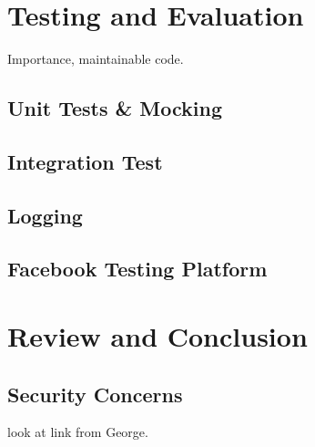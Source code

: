 \documentclass[a4paper, 11pt]{article}
\begin{document}
\clearpage


\section{Testing and Evaluation}
Importance, maintainable code.
\subsection{Unit Tests \& Mocking}
\subsection{Integration Test}
\subsection{Logging}
\subsection{Facebook Testing Platform}

\section{Review and Conclusion}
\subsection{Security Concerns} look at link from George. 




\vspace{\baselineskip}
\vspace{\baselineskip}
\vspace{\baselineskip}


\clearpage

\end{document}
